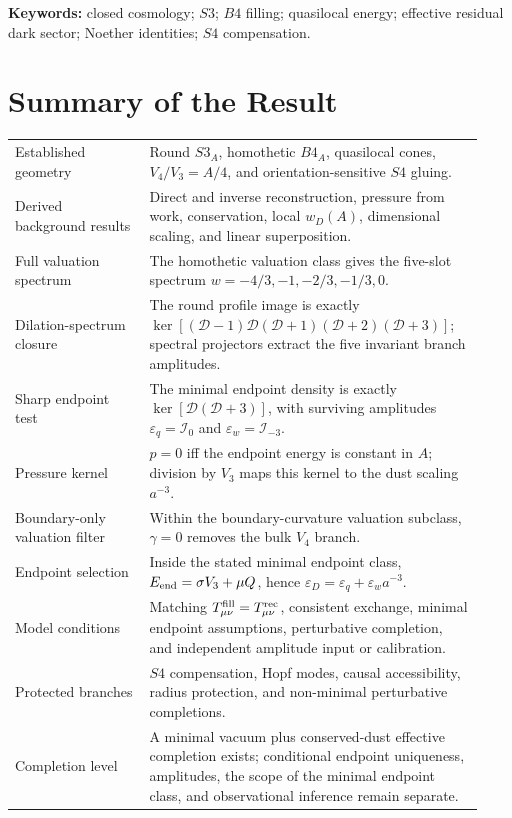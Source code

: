 \documentclass[11pt,a4paper]{article}
\def\Bfour{B4}%
\def\Sthree{S3}%
\def\Sfour{S4}%
\numberwithin{equation}{section}
\theoremstyle{remark}
\newcommand{\Sthree}{S^3}
\newcommand{\Sfour}{S^4}
\newcommand{\Bfour}{B^4}
\newcommand{\Dil}{\mathscr{D}}
\newcommand{\epsD}{\varepsilon_D}
\begin{document}
\noindent\textbf{Keywords:} closed cosmology; \(\Sthree\); \(\Bfour\) filling; quasilocal energy; effective residual dark sector; Noether identities; \(\Sfour\) compensation.

\section*{Summary of the Result}
\begin{center}
\begin{tabular}{@{}p{0.27\linewidth}p{0.66\linewidth}@{}}
\toprule
Established geometry & Round \(\Sthree_A\), homothetic \(\Bfour_A\), quasilocal cones, \(V_4/V_3=A/4\), and orientation-sensitive \(\Sfour\) gluing. \\
Derived background results & Direct and inverse reconstruction, pressure from work, conservation, local \(w_D(A)\), dimensional scaling, and linear superposition. \\
Full valuation spectrum & The homothetic valuation class gives the five-slot spectrum \(w=-4/3,-1,-2/3,-1/3,0\). \\
Dilation-spectrum closure & The round profile image is exactly \(\ker[(\Dil-1)\Dil(\Dil+1)(\Dil+2)(\Dil+3)]\); spectral projectors extract the five invariant branch amplitudes. \\
Sharp endpoint test & The minimal endpoint density is exactly \(\ker[\Dil(\Dil+3)]\), with surviving amplitudes \(\varepsilon_q=\mathcal I_0\) and \(\varepsilon_w=\mathcal I_{-3}\). \\
Pressure kernel & \(p=0\) iff the endpoint energy is constant in \(A\); division by \(V_3\) maps this kernel to the dust scaling \(a^{-3}\). \\
Boundary-only valuation filter & Within the boundary-curvature valuation subclass, \(\gamma=0\) removes the bulk \(V_4\) branch. \\
Endpoint selection & Inside the stated minimal endpoint class, \(E_{\rm end}=\sigma V_3+\mu Q\), hence \(\epsD=\varepsilon_q+\varepsilon_w a^{-3}\). \\
Model conditions & Matching \(T^{\rm fill}_{\mu\nu}=T^{\rm rec}_{\mu\nu}\), consistent exchange, minimal endpoint assumptions, perturbative completion, and independent amplitude input or calibration. \\
Protected branches & \(\Sfour\) compensation, Hopf modes, causal accessibility, radius protection, and non-minimal perturbative completions. \\
Completion level & A minimal vacuum plus conserved-dust effective completion exists; conditional endpoint uniqueness, amplitudes, the scope of the minimal endpoint class, and observational inference remain separate. \\
\bottomrule
\end{tabular}
\end{center}
\end{document}
